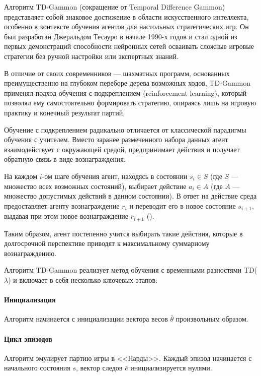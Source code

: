Алгоритм TD-Gammon (сокращение от Temporal Difference Gammon) представляет собой знаковое достижение в области искусственного интеллекта, особенно в контексте обучения агентов для настольных стратегических игр. Он был разработан Джеральдом Тесауро в начале 1990-х годов и стал одной из первых демонстраций способности нейронных сетей осваивать сложные игровые стратегии без ручной настройки или экспертных знаний.

В отличие от своих современников --- шахматных программ, основанных преимущественно на глубоком переборе дерева возможных ходов, TD-Gammon применял подход обучения с подкреплением (reinforcement learning), который позволял ему самостоятельно формировать стратегию, опираясь лишь на игровую практику и конечный результат партий.

Обучение с подкреплением радикально отличается от классической парадигмы обучения с учителем. Вместо заранее размеченного набора данных агент взаимодействует с окружающей средой, предпринимает действия и получает обратную связь в виде вознаграждения.

На каждом $i$-ом шаге обучения агент, находясь в состоянии $s_i \in S$ (где $S$ --- множество всех возможных состояний), выбирает действие $a_i \in A$ (где $A$ --- множество допустимых действий в данном состоянии). В ответ на действие среда предоставляет агенту вознаграждение $r_i$ и переводит его в новое состояние $s_{i+1}$, выдавая при этом новое вознаграждение $r_{i+1}$ ().

\pagebreak

Таким образом, агент постепенно учится выбирать такие действия, которые в долгосрочной перспективе приводят к максимальному суммарному вознаграждению.


Алгоритм TD-Gammon реализует метод обучения с временными разностями TD($\lambda$) и включает в себя несколько ключевых этапов:

\paragraph{Инициализация}
Алгоритм начинается с инициализации вектора весов $\bar{\theta}$ произвольным образом.

\paragraph{Цикл эпизодов}
Алгоритм эмулирует партию игры в <<Нарды>>. Каждый эпизод начинается с начального состояния $s$, вектор следов $\bar{e}$ инициализируется нулями.

